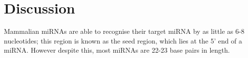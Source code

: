 \documentclass{article}
\begin{document}
\section{Discussion}\label{discussion}

Mammalian miRNAs are able to recognise their target miRNA by as little as 6-8 nucleotides; this region is known as the seed region, which lies at the 5' end of a miRNA. However despite this, most miRNAs are 22-23 base pairs in length.



\end{document}
